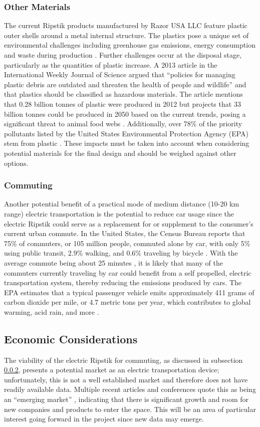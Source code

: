 \subsubsection{Other Materials}
The current Ripstik products manufactured by Razor USA LLC feature plastic outer shells around a metal internal structure. The plastics pose a unique set of environmental challenges including greenhouse gas emissions, energy consumption and waste during production \cite{PlasticAssessment}. Further challenges occur at the disposal stage, particularly as the quantities of plastic increase. A 2013 article in the International Weekly Journal of Science argued that ``policies for managing plastic debris are outdated and threaten the health of people and wildlife'' \cite{Plastic} and that plastics should be classified as hazardous materials. The article mentions that 0.28 billion tonnes of plastic were produced in 2012 but projects that 33 billion tonnes could be produced in 2050 based on the current trends, posing a significant threat to animal food webs \cite{Plastic}. Additionally, over 78\% of the priority pollutants listed by the United States Environmental Protection Agency (EPA) stem from plastic \cite{Plastic}. These impacts must be taken into account when considering potential materials for the final design and should be weighed against other options.
\subsubsection{Commuting} \label{commuting}
Another potential benefit of a practical mode of medium distance (10-20 km range) electric transportation is the potential to reduce car usage since the electric Ripstik could serve as a replacement for or supplement to the consumer's current urban commute. In the United States, the Census Bureau reports that 75\% of commuters, or 105 million people, commuted alone by car, with only 5\% using public transit, 2.9\% walking, and 0.6\% traveling by bicycle \cite{harvard}. With the average commute being about 25 minutes \cite{harvard}, it is likely that many of the commuters currently traveling by car could benefit from a self propelled, electric transportation system, thereby reducing the emissions produced by cars. The EPA estimates that a typical passenger vehicle emits approximately 411 grams of carbon dioxide per mile, or 4.7 metric tons per year, which contributes to global warming, acid rain, and more \cite{EPA}.
\subsection{Economic Considerations}
The viability of the electric Ripstik for commuting, as discussed in subsection \ref{commuting}, presents a potential market as an electric transportation device; unfortunately, this is not a well established market and therefore does not have readily available data. Multiple recent articles and conferences quote this as being an ``emerging market'' \cite{emerging1,emerging2,emerging3}, indicating that there is significant growth and room for new companies and products to enter the space. This will be an area of particular interest going forward in the project since new data may emerge.

